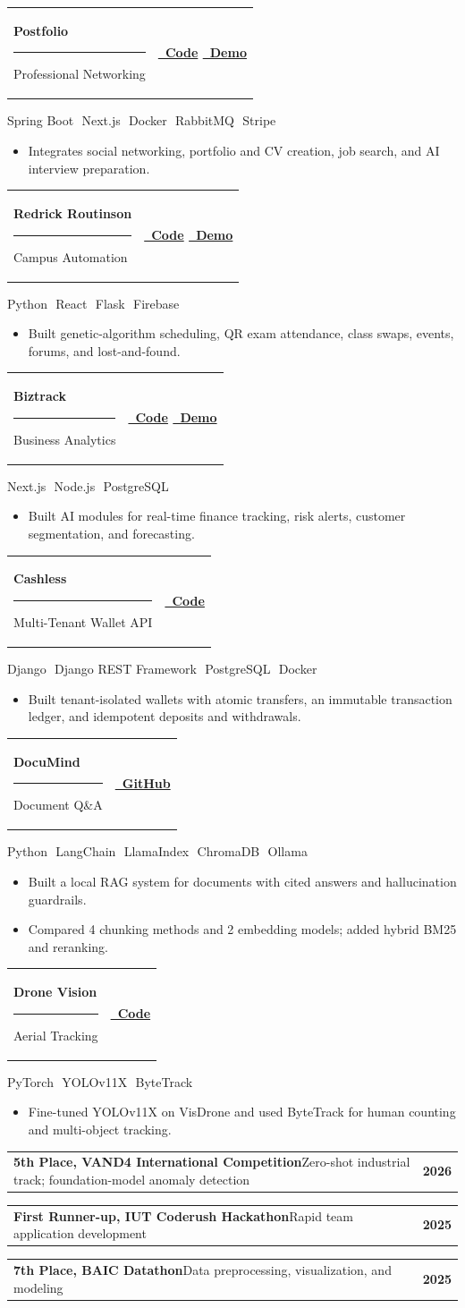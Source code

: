 \documentclass[10pt,letterpaper]{article}
\makeatletter
\newcommand{\hair}{{\color{Ink}\hrule height 1.1pt}}
\newcommand{\cvsection}[1]{%
  \vspace{9.5pt}%
  {\fontsize{9.5pt}{10pt}\selectfont\bfseries\color{Ink}\textls[180]{\MakeUppercase{#1}}}\par
  \vspace{3pt}\hair\vspace{5pt}%
}
\newcommand{\entry}[2]{%
  \begin{tabularx}{\linewidth}{@{}X@{\hspace{1em}}r@{}}
    #1 & {\fontsize{9.3pt}{10pt}\selectfont\bfseries\color{Ink}#2}
  \end{tabularx}\par}
\newcommand{\dividerdot}{\,\textcolor{Muted}{\raisebox{0.15ex}{\scriptsize$\bullet$}}\,}
\newcommand{\project}[5]{%
  \entry{\textbf{\color{Ink}#1}\hspace{0.45em}\textcolor{Muted}{\rule[-0.05em]{0.7pt}{0.9em}}\hspace{0.45em}#2}{#4}%
  \vspace{0.5pt}
  {\fontsize{9.3pt}{10.5pt}\selectfont\color{Muted}#3}\par
  \vspace{1pt}
  \begin{itemize}\item #5\end{itemize}\vspace{4.5pt}}
\newcommand{\award}[3]{%
  \entry{\textbf{\color{Ink}#1}\hspace{0.4em}\textcolor{Muted}{#2}}{#3}\vspace{3pt}}
\makeatother
\begin{document}
\cvsection{Projects}
\project{Postfolio}{Professional Networking}{Spring Boot \dividerdot Next.js \dividerdot Docker \dividerdot RabbitMQ \dividerdot Stripe}{%
  \href{https://github.com/shufanshahi/Postfolio}{\faGithub\ Code}\enspace
  \href{https://www.youtube.com/watch?v=U6N-ioqvg9c}{\faPlayCircle\ Demo}}
{Integrates social networking, portfolio and CV creation, job search, and AI interview preparation.}

\project{Redrick Routinson}{Campus Automation}{Python \dividerdot React \dividerdot Flask \dividerdot Firebase}{%
  \href{https://github.com/shufanshahi/RedrickRoutinson}{\faGithub\ Code}\enspace
  \href{https://www.youtube.com/watch?v=Fg-GkZrsIzw}{\faPlayCircle\ Demo}}
{Built genetic-algorithm scheduling, QR exam attendance, class swaps, events, forums, and lost-and-found.}

\project{Biztrack}{Business Analytics}{Next.js \dividerdot Node.js \dividerdot PostgreSQL}{%
  \href{https://github.com/shufanshahi/biztrack}{\faGithub\ Code}\enspace
  \href{https://www.youtube.com/watch?v=STNoXqq8kQM}{\faPlayCircle\ Demo}}
{Built AI modules for real-time finance tracking, risk alerts, customer segmentation, and forecasting.}

\project{Cashless}{Multi-Tenant Wallet API}{Django \dividerdot Django REST Framework \dividerdot PostgreSQL \dividerdot Docker}{%
  \href{https://github.com/shufanshahi/Cashless}{\faGithub\ Code}}
{Built tenant-isolated wallets with atomic transfers, an immutable transaction ledger, and idempotent deposits and withdrawals.}

\project{DocuMind}{Document Q\&A}{Python \dividerdot LangChain \dividerdot LlamaIndex \dividerdot ChromaDB \dividerdot Ollama}{%
  \href{https://github.com/shufanshahi/DocuMind}{\faGithub\ GitHub}}
{Built a local RAG system for documents with cited answers and hallucination guardrails.
  \item Compared 4 chunking methods and 2 embedding models; added hybrid BM25 and reranking.}

\project{Drone Vision}{Aerial Tracking}{PyTorch \dividerdot YOLOv11X \dividerdot ByteTrack}{%
  \href{https://github.com/shufanshahi/droneVision}{\faGithub\ Code}}
{Fine-tuned YOLOv11X on VisDrone and used ByteTrack for human counting and multi-object tracking.}

\cvsection{Achievements}
\award{5th Place, VAND4 International Competition}{Zero-shot industrial track; foundation-model anomaly detection}{2026}
\award{First Runner-up, IUT Coderush Hackathon}{Rapid team application development}{2025}
\award{7th Place, BAIC Datathon}{Data preprocessing, visualization, and modeling}{2025}
\end{document}
